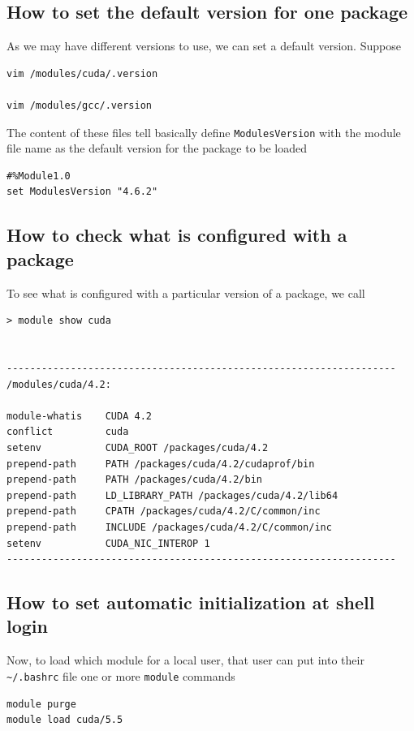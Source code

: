 \subsection{How to set the default version for one package}
\label{sec:.version-module-file}

As we may have different versions to use, we can set a default version. Suppose
\begin{verbatim}
vim /modules/cuda/.version

vim /modules/gcc/.version
\end{verbatim}

The content of these files tell basically define \verb!ModulesVersion! with the
module file name as the default version for the package to be loaded
\begin{verbatim}
#%Module1.0
set ModulesVersion "4.6.2"
\end{verbatim}

\subsection{How to check what is configured with a package}

To see what is configured with a particular version of a package, we call
\begin{verbatim}
> module show cuda


-------------------------------------------------------------------
/modules/cuda/4.2:

module-whatis    CUDA 4.2 
conflict         cuda 
setenv           CUDA_ROOT /packages/cuda/4.2 
prepend-path     PATH /packages/cuda/4.2/cudaprof/bin 
prepend-path     PATH /packages/cuda/4.2/bin 
prepend-path     LD_LIBRARY_PATH /packages/cuda/4.2/lib64 
prepend-path     CPATH /packages/cuda/4.2/C/common/inc 
prepend-path     INCLUDE /packages/cuda/4.2/C/common/inc 
setenv           CUDA_NIC_INTEROP 1 
-------------------------------------------------------------------
\end{verbatim}

\subsection{How to set automatic initialization at shell login}


Now, to load which module for a local user, that user can put into their
\verb!~/.bashrc! file one or more \verb!module! commands
\begin{verbatim}
module purge
module load cuda/5.5
\end{verbatim}

